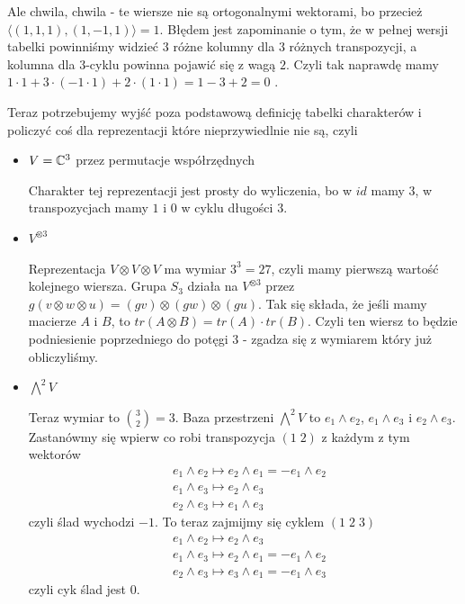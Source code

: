 \begin{example}
  Ale chwila, chwila - te wiersze nie są ortogonalnymi wektorami, bo przecież $\langle (1,1,1),(1,-1,1)\rangle=1$. Błędem jest zapominanie o tym, że w pełnej wersji tabelki powinniśmy widzieć $3$ różne kolumny dla $3$ różnych transpozycji, a kolumna dla $3$-cyklu powinna pojawić się z wagą $2$. Czyli tak naprawdę mamy $1\cdot1+3\cdot (-1\cdot 1)+2\cdot (1\cdot 1)=1-3+2=0$ .
  \vskip1cm

  Teraz potrzebujemy wyjść poza podstawową definicję tabelki charakterów i policzyć coś dla reprezentacji które nieprzywiedlnie nie są, czyli
  \begin{itemize}
    \item $V=\mathbb{C}^3$ przez permutacje współrzędnych

      Charakter tej reprezentacji jest prosty do wyliczenia, bo w $id$ mamy $3$, w transpozycjach mamy $1$ i $0$ w cyklu długości $3$. 
    \item {\color{orange}$V^{\otimes 3}$}

      Reprezentacja $V\otimes V\otimes V$ ma wymiar $3^3=27$, czyli mamy pierwszą wartość kolejnego wiersza. 
  Grupa $S_3$ działa na $V^{\otimes 3}$ przez $g(v\otimes w\otimes u)=(gv)\otimes(gw)\otimes (gu)$. Tak się składa, że jeśli mamy macierze $A$ i $B$, to $tr(A\otimes B)=tr(A)\cdot tr(B)$. Czyli ten wiersz to będzie podniesienie poprzedniego do potęgi $3$ - zgadza się z wymiarem który już obliczyliśmy.
    \item {\color{orange}$\bigwedge^2V$}

      Teraz wymiar to $\binom{3}{2}=3$. Baza przestrzeni $\bigwedge^2V$ to $e_1\wedge e_2$, $e_1\wedge e_3$ i $e_2\wedge e_3$. Zastanówmy się wpierw co robi transpozycja $(1\;2)$ z każdym z tym wektorów
      \begin{align*}
        &e_1\wedge e_2\mapsto e_2\wedge e_1=-e_1\wedge e_2 \\ 
        &e_1\wedge e_3\mapsto e_2\wedge e_3 \\ 
        &e_2\wedge e_3\mapsto e_1\wedge e_3
      \end{align*}
      czyli ślad wychodzi $-1$. To teraz zajmijmy się cyklem $(1\;2\;3)$
      \begin{align*}
        &e_1\wedge e_2\mapsto e_2\wedge e_3 \\ 
        &e_1\wedge e_3\mapsto e_2\wedge e_1=-e_1\wedge e_2 \\ 
        &e_2\wedge e_3\mapsto e_3\wedge e_1=-e_1\wedge e_3
      \end{align*}
      czyli cyk ślad jest $0$.


\end{itemize}
\end{example}
